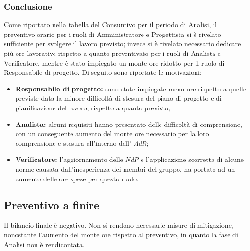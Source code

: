 	\subsubsection{Conclusione}
		Come riportato nella tabella del Consuntivo per il periodo di Analisi, il preventivo orario per i ruoli di Amministratore e Progettista si è rivelato sufficiente per svolgere il lavoro previsto; invece si è rivelato necessario dedicare più ore lavorative rispetto a quanto preventivato per i ruoli di Analista e Verificatore, mentre è stato impiegato un monte ore ridotto per il ruolo di Responsabile di progetto. Di seguito sono riportate le motivazioni:
		\begin{itemize}
			\item \textbf{Responsabile di progetto:} sono state impiegate meno ore rispetto a quelle previste data la minore difficoltà di stesura del piano di progetto e di pianificazione del lavoro, rispetto a quanto previsto;
			\item \textbf{Analista:} alcuni requisiti hanno presentato delle difficoltà di comprensione, con un conseguente aumento del monte ore necessario per la loro comprensione e stesura all'interno dell' \textit{AdR{}};
			\item \textbf{Verificatore:} l'aggiornamento delle \textit{NdP{}} e l'applicazione scorretta di alcune norme causata dall'inesperienza dei membri del gruppo, ha portato ad un aumento delle ore spese per questo ruolo.
		\end{itemize}

\subsection{Preventivo a finire}
Il bilancio finale è negativo.
Non si rendono necessarie misure di mitigazione, nonostante l'aumento del monte ore rispetto al preventivo, in quanto la fase di Analisi non è rendicontata.
